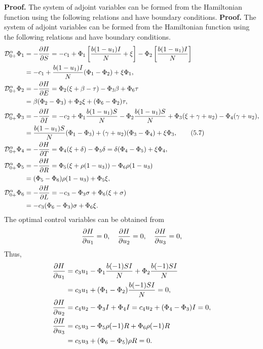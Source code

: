 \documentclass[10pt]{NSP1}
\newcommand{\CD}{\mathcal{D}}
\begin{document}
\textbf{Proof.} The system of adjoint variables can be formed from the Hamiltonian function using the following relations and have boundary conditions.
\textbf{Proof.} The system of adjoint variables can be formed from the Hamiltonian function using the following relations and have boundary conditions.
\begin{align}
\CD_{0+}^{\alpha} \Phi_1 &= -\frac{\partial H}{\partial S} = -c_1 + \Phi_1 \left[ \frac{b (1-u_1) I}{N} + \xi \right] - \Phi_2 \left[ \frac{b (1-u_1) I}{N} \right] \notag \\
&= -c_1 + \frac{b (1-u_1) I}{N} (\Phi_1 - \Phi_2) + \xi \Phi_1, \notag\\
\CD_{0+}^{\alpha} \Phi_2 &= -\frac{\partial H}{\partial E} = \Phi_2 (\xi + \beta - \tau) - \Phi_3 \beta + \Phi_6 \tau \notag \notag\\
&= \beta(\Phi_2 - \Phi_3) + \Phi_2 \xi + (\Phi_6 - \Phi_2) \tau, \notag\\
\CD_{0+}^{\alpha} \Phi_3 &= -\frac{\partial H}{\partial I} = -c_2 + \Phi_1 \frac{b (1-u_1) S}{N} - \Phi_2 \frac{b (1-u_1) S}{N} + \Phi_3 (\xi + \gamma + u_2) - \Phi_4 (\gamma + u_2), \notag \\
&= \frac{b (1-u_1) S}{N} (\Phi_1 - \Phi_3) + (\gamma + u_2)(\Phi_3 - \Phi_4) + \xi \Phi_3, \tag{5.7} \\
\CD_{0+}^{\alpha} \Phi_4 &= -\frac{\partial H}{\partial T} = \Phi_4 (\xi + \delta) - \Phi_5 \delta = \delta(\Phi_4 - \Phi_5) + \xi \Phi_4, \notag \\
\CD_{0+}^{\alpha} \Phi_5 &= -\frac{\partial H}{\partial R} = \Phi_5 (\xi + \rho(1-u_3)) - \Phi_6 \rho(1-u_3) \notag \\
&= (\Phi_5 - \Phi_6) \rho(1-u_3) + \Phi_5 \xi, \notag \\
\CD_{0+}^{\alpha} \Phi_6 &= -\frac{\partial H}{\partial L} = -c_3 - \Phi_3 \sigma + \Phi_6 (\xi + \sigma) \notag \\
&= -c_3 (\Phi_6 - \Phi_3) \sigma + \Phi_6 \xi. \notag
\end{align}
The optimal control variables can be obtained from
\begin{equation}
\frac{\partial H}{\partial u_1} = 0, \quad \frac{\partial H}{\partial u_2} = 0, \quad \frac{\partial H}{\partial u_3} = 0,\notag
\end{equation}
Thus,
\begin{align}
\frac{\partial H}{\partial u_1} &= c_3 u_1 - \Phi_1 \frac{b (-1) S I}{N} + \Phi_2 \frac{b (-1) S I}{N} \notag \\
&= c_3 u_1 + (\Phi_1 - \Phi_2) \frac{b (-1) S I}{N} = 0, \notag \\
\frac{\partial H}{\partial u_2} &= c_4 u_2 - \Phi_3 I + \Phi_4 I = c_4 u_2 + (\Phi_4 - \Phi_3) I = 0, \notag \\
\frac{\partial H}{\partial u_3} &= c_5 u_3 - \Phi_5 \rho(-1) R + \Phi_6 \rho(-1) R \notag \\
&= c_5 u_3 + (\Phi_6 - \Phi_5) \rho R = 0. \notag
\end{align}
\end{document}
